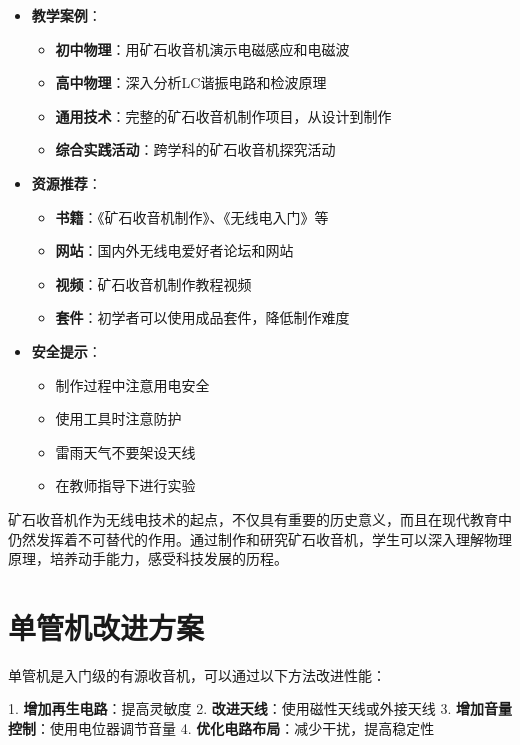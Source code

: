 \documentclass[12pt,UTF8]{ctexbook}
\begin{document}
\begin{itemize}[leftmargin=3.5em]
    \item \textbf{教学案例}：
        \begin{itemize}[leftmargin=3.5em]
            \item \textbf{初中物理}：用矿石收音机演示电磁感应和电磁波
            \item \textbf{高中物理}：深入分析LC谐振电路和检波原理
            \item \textbf{通用技术}：完整的矿石收音机制作项目，从设计到制作
            \item \textbf{综合实践活动}：跨学科的矿石收音机探究活动
        \end{itemize}
    \item \textbf{资源推荐}：
        \begin{itemize}[leftmargin=3.5em]
            \item \textbf{书籍}：《矿石收音机制作》、《无线电入门》等
            \item \textbf{网站}：国内外无线电爱好者论坛和网站
            \item \textbf{视频}：矿石收音机制作教程视频
            \item \textbf{套件}：初学者可以使用成品套件，降低制作难度
        \end{itemize}
    \item \textbf{安全提示}：
        \begin{itemize}[leftmargin=3.5em]
            \item 制作过程中注意用电安全
            \item 使用工具时注意防护
            \item 雷雨天气不要架设天线
            \item 在教师指导下进行实验
        \end{itemize}
\end{itemize}

矿石收音机作为无线电技术的起点，不仅具有重要的历史意义，而且在现代教育中仍然发挥着不可替代的作用。通过制作和研究矿石收音机，学生可以深入理解物理原理，培养动手能力，感受科技发展的历程。

\section{单管机改进方案}

单管机是入门级的有源收音机，可以通过以下方法改进性能：

1. \textbf{增加再生电路}：提高灵敏度
2. \textbf{改进天线}：使用磁性天线或外接天线
3. \textbf{增加音量控制}：使用电位器调节音量
4. \textbf{优化电路布局}：减少干扰，提高稳定性
\end{document}
